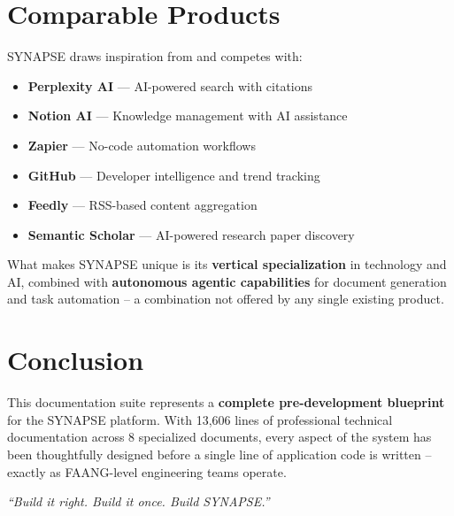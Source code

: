 \documentclass[12pt,a4paper]{report}
\begin{document}
\section{Comparable Products}

SYNAPSE draws inspiration from and competes with:

\begin{itemize}
    \item \textbf{Perplexity AI} --- AI-powered search with citations
    \item \textbf{Notion AI} --- Knowledge management with AI assistance
    \item \textbf{Zapier} --- No-code automation workflows
    \item \textbf{GitHub} --- Developer intelligence and trend tracking
    \item \textbf{Feedly} --- RSS-based content aggregation
    \item \textbf{Semantic Scholar} --- AI-powered research paper discovery
\end{itemize}

\noindent What makes SYNAPSE unique is its \textbf{vertical specialization} in technology
and AI, combined with \textbf{autonomous agentic capabilities} for document generation
and task automation -- a combination not offered by any single existing product.

\section{Conclusion}

This documentation suite represents a \textbf{complete pre-development blueprint} for
the SYNAPSE platform. With 13,606 lines of professional technical documentation across
8 specialized documents, every aspect of the system has been thoughtfully designed before
a single line of application code is written -- exactly as FAANG-level engineering teams
operate.

\vspace{1em}
\begin{center}
\textit{``Build it right. Build it once. Build SYNAPSE.''}
\end{center}
\end{document}
